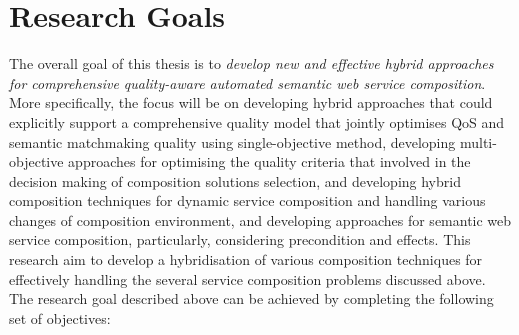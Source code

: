\section{Research Goals}
The overall goal of this thesis is to \emph{develop new and effective hybrid approaches for comprehensive quality-aware automated semantic web service composition}. More specifically, the focus will be on developing hybrid approaches that could explicitly support a comprehensive quality model that jointly optimises QoS and semantic matchmaking quality using single-objective method, developing multi-objective approaches for optimising the quality criteria that involved in the decision making of composition solutions selection, and developing hybrid composition techniques for dynamic service composition and handling various changes of composition environment, and developing approaches for semantic web service composition, particularly, considering precondition and effects. This research aim to develop a hybridisation of various composition techniques for effectively handling the several service composition problems discussed above. The research goal described above can be achieved by completing the following set of objectives:


